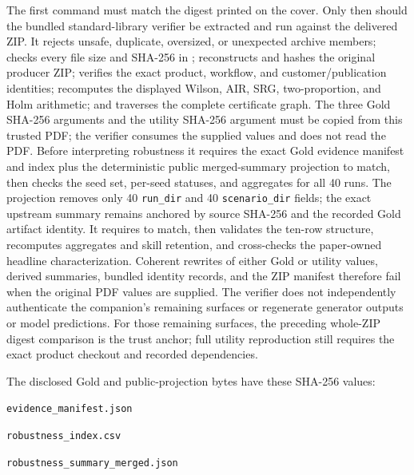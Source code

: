 The first command must match the digest printed on the cover. Only then should the bundled
standard-library verifier be extracted and run against the delivered ZIP. It rejects unsafe,
duplicate, oversized, or unexpected archive members; checks every file size and SHA-256 in
; reconstructs and hashes the original producer ZIP; verifies the exact
product, workflow, and customer/publication identities; recomputes the displayed Wilson, AIR, SRG,
two-proportion, and Holm arithmetic; and traverses the complete certificate graph. The three Gold
SHA-256 arguments and the utility SHA-256 argument must be copied from this trusted PDF; the
verifier consumes the supplied values and does not read the PDF. Before interpreting robustness it
requires the exact Gold evidence manifest and index plus the deterministic public merged-summary
projection to match, then checks the seed set, per-seed statuses, and aggregates for all 40 runs.
The projection removes only 40 \texttt{run\_dir} and 40 \texttt{scenario\_dir} fields; the exact
upstream summary remains anchored by source SHA-256
and the recorded Gold artifact identity. It requires
 to match, then validates the ten-row structure,
recomputes aggregates and skill retention, and cross-checks the paper-owned headline
characterization. Coherent rewrites of either Gold or utility values, derived summaries, bundled
identity records, and the ZIP manifest therefore fail when the original PDF values are supplied.
The verifier does not independently authenticate the companion's remaining surfaces or regenerate
generator outputs or model predictions. For those remaining surfaces, the preceding
whole-ZIP digest comparison is the trust anchor; full utility reproduction still requires the exact
product checkout and recorded dependencies.

The disclosed Gold and public-projection bytes have these SHA-256 values:

\begin{KeyBox}
  \small
  \texttt{evidence\_manifest.json}\par
  \IdentityText{\GoldEvidenceManifestShaRaw}\par\smallskip
  \texttt{robustness\_index.csv}\par
  \IdentityText{\GoldIndexShaRaw}\par\smallskip
  \texttt{robustness\_summary\_merged.json}\par
  \IdentityText{\GoldSummaryShaRaw}
\end{KeyBox}

